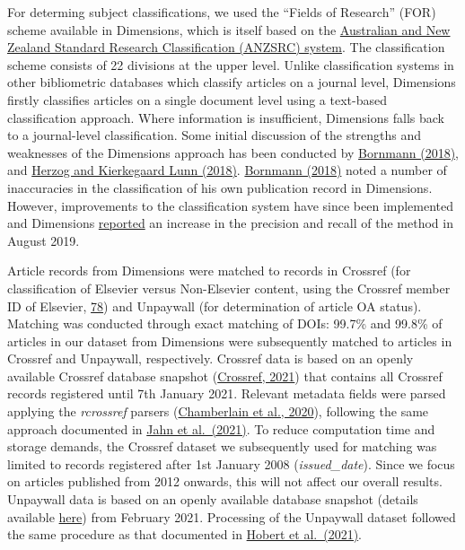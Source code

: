 \documentclass[
]{article}
\begin{document}
For determing subject classifications, we used the ``Fields of Research'' (FOR) scheme available in Dimensions, which is itself based on the \href{https://dimensions.freshdesk.com/support/solutions/articles/23000018826-what-is-the-background-behind-the-fields-of-research-for-classification-system-}{Australian and New Zealand Standard Research Classification (ANZSRC) system}. The classification scheme consists of 22 divisions at the upper level. Unlike classification systems in other bibliometric databases which classify articles on a journal level, Dimensions firstly classifies articles on a single document level using a text-based classification approach. Where information is insufficient, Dimensions falls back to a journal-level classification. Some initial discussion of the strengths and weaknesses of the Dimensions approach has been conducted by \href{https://doi.org/10.1007/s11192-018-2855-y}{Bornmann (2018)}, and \href{https://doi.org/10.1007/s11192-018-2854-z}{Herzog and Kierkegaard Lunn (2018)}. \href{https://doi.org/10.1007/s11192-018-2855-y}{Bornmann (2018)} noted a number of inaccuracies in the classification of his own publication record in Dimensions. However, improvements to the classification system have since been implemented and Dimensions \href{https://www.dimensions.ai/release-notes/}{reported} an increase in the precision and recall of the method in August 2019.

Article records from Dimensions were matched to records in Crossref (for classification of Elsevier versus Non-Elsevier content, using the Crossref member ID of Elsevier, \href{https://www.crossref.org/members/prep/78}{78}) and Unpaywall (for determination of article OA status). Matching was conducted through exact matching of DOIs: 99.7\% and 99.8\% of articles in our dataset from Dimensions were subsequently matched to articles in Crossref and Unpaywall, respectively. Crossref data is based on an openly available Crossref database snapshot (\href{https://academictorrents.com/details/e4287cb7619999709f6e9db5c359dda17e93d515}{Crossref, 2021}) that contains all Crossref records registered until 7th January 2021. Relevant metadata fields were parsed applying the \emph{rcrossref} parsers (\href{https://CRAN.R-project.org/package=rcrossref}{Chamberlain et al., 2020}), following the same approach documented in \href{https://doi.org/10.1002/asi.24549}{Jahn et al.~(2021)}. To reduce computation time and storage demands, the Crossref dataset we subsequently used for matching was limited to records registered after 1st January 2008 (\emph{issued\_date}). Since we focus on articles published from 2012 onwards, this will not affect our overall results. Unpaywall data is based on an openly available database snapshot (details available \href{https://unpaywall.org/products/snapshot}{here}) from February 2021. Processing of the Unpaywall dataset followed the same procedure as that documented in \href{https://doi.org/10.18452/22728}{Hobert et al.~(2021)}.
\end{document}

